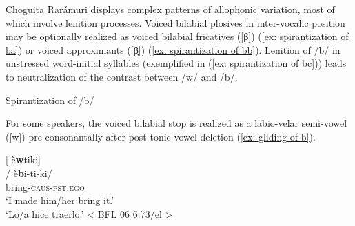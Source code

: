 Choguita Rarámuri displays complex patterns of allophonic variation, most of which involve lenition processes. Voiced bilabial plosives in inter-vocalic position may be optionally realized as voiced bilabial fricatives ([β]) (\ref{ex: spirantization of ba}) or voiced approximants ([β̞]) (\ref{ex: spirantization of bb}). Lenition of /b/ in unstressed word-initial syllables (exemplified in (\ref{ex: spirantization of bc})) leads to neutralization of the contrast between /w/ and /b/.

\ea\label{ex: spirantization of b}
{Spirantization of /b/}

    \label{ex: spirantization of ba}
        \label{ex: spirantization of bb}
                \label{ex: spirantization of bc}
    \z
\z

For some speakers, the voiced bilabial stop is realized as a labio-velar semi-vowel ([w]) pre-consonantally after post-tonic vowel deletion (\ref{ex: gliding of b}).

\ea\label{ex: gliding of b}

            [ˈè\textbf{w}tiki] \\
            /ˈè\textbf{b}i-ti-ki/ \\
            bring-\textsc{caus-pst.ego}\\
            `I made him/her bring it.'\\
            `Lo/a hice traerlo.' < BFL 06 6:73/el >\\
\z

